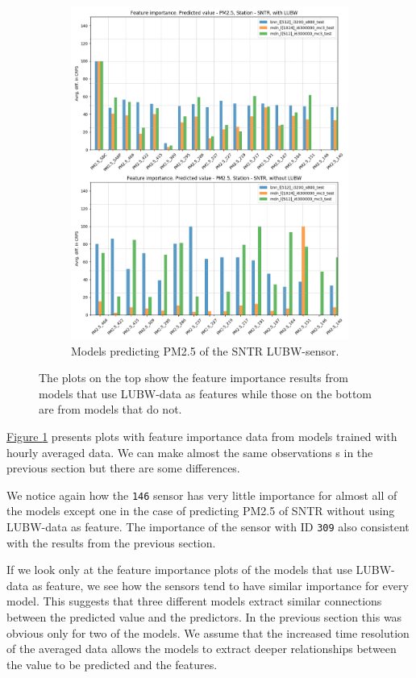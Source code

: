 \documentclass[12pt,a4paper,twoside]{scrartcl}
\numberwithin{equation}{section}
\newcommand{\reffig}[1]{\hyperref[#1]{Figure \ref*{#1}}}
\begin{document}
\begin{figure}[H]
\begin{subfigure}[t]{0.49\textwidth}
    \includegraphics[width=\textwidth,height=1.2\textwidth]{figures/figs_12h/feature_importance_CRPS_SNTR_P2}%
    \caption{Models predicting PM2.5 of the SNTR LUBW-sensor.}
  \end{subfigure}
  \caption[Feature importance (twelve hourly average)]{The plots on the top show the feature importance results from models that use LUBW-data as features while those on the bottom are from models that do not.}\label{fig:feat-imp-12h}
\end{figure}
\reffig{fig:feat-imp-12h} presents plots with feature importance data from models trained with hourly averaged data. We can make almost the same observations s in the previous section but there are some differences.

We notice again how the \texttt{146} sensor has very little importance for almost all of the models except one in the case of predicting PM2.5 of SNTR without using LUBW-data as feature. The importance of the sensor with ID \texttt{309} also consistent with the results from the previous section.

If we look only at the feature importance plots of the models that use LUBW-data as feature, we see how the sensors tend to have similar importance for every model. This suggests that three different models extract similar connections between the predicted value and the predictors. In the previous section this was obvious only for two of the models. We assume that the increased time resolution of the averaged data allows the models to extract deeper relationships between the value to be predicted and the features.
\end{document}
